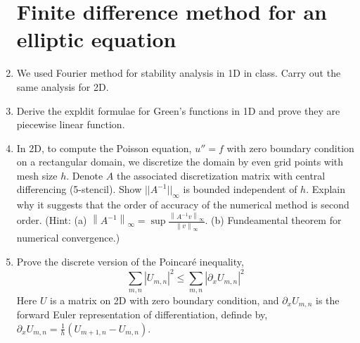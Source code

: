 \documentclass{article}
\newcommand\NoIndent[1]{%
  \begingroup
  \par
  \parshape0
  #1\par
  \endgroup
}
\begin{document}
\begin{enumerate}
\NoIndent{\section{Finite difference method for an elliptic equation}}

	\item We used Fourier method for stability analysis in 1D in class.
		Carry out the same analysis for 2D.

	\item Derive the expldit formulae for Green's functions in 1D
		and prove they are piecewise linear function.

	\item In 2D, to compute the Poisson equation, $u'' = f$
		with zero boundary condition on a rectangular domain,
		we discretize the domain by even grid points with mesh size $h$.
		Denote $A$ the associated discretization matrix with central differencing (5-stencil).
		Show $||A^{-1}||_\infty$ is bounded independent of $h$.
		Explain why it suggests that the order of accuracy of the numerical method is second order.
		(Hint:
			(a) $\left\|A^{-1}\right\|_\infty =
				\displaystyle\sup\frac{\left\|A^{-1}v\right\|_\infty}{\left\|v\right\|_\infty}$.
			(b) Fundeamental theorem for numerical convergence.)

	\item Prove the discrete version of the Poincar\'e inequality,
		\begin{equation*}
			\sum_{m,n}\left|U_{m,n}\right|^2 \leq \sum_{m,n}\left|\partial_x U_{m,n}\right|^2
		\end{equation*}
		Here $U$ is a matrix on 2D with zero boundary condition,
		and $\partial_x U_{m,n}$ is the forward Euler representation of differentiation,
		definde by, $\partial_x U_{m,n} = \frac{1}{h}\left(U_{m+1,n} - U_{m,n}\right)$.
\end{enumerate}
\end{document}
